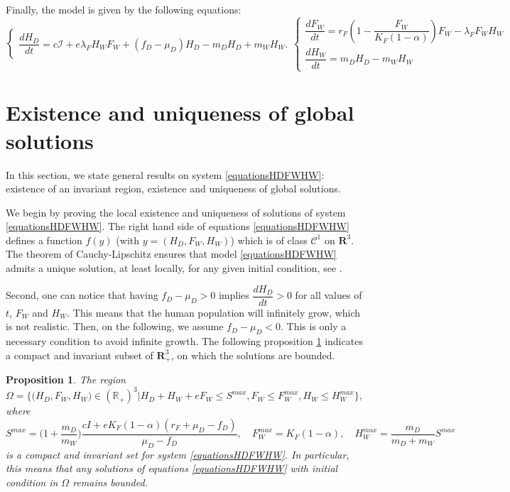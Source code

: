 \documentclass{article}
\newcommand{\lfw}{\lambda_{F}}
\newcommand{\lfw}{\lambda_{F}}
\newcommand{\cI}{c \mathcal{I}}
\newtheorem{prop}{Proposition}
\begin{document}
Finally, the model is given by the following equations:
\begin{subequations}
\begin{equation}
\left\{ \begin{array}{l}
\dfrac{dH_D}{dt}= \cI + e\lfw H_W F_W + (f_D - \mu_D) H_D - m_D H_D + m_W H_W.
\end{array}\right.
\end{equation}
\begin{equation}
\left\lbrace \begin{array}{l}
\dfrac{dF_W}{dt} = r_F \left(1 - \dfrac{F_W}{K_F(1-\alpha)} \right) F_W - \lfw F_W H_W \\
\dfrac{dH_W}{dt}= m_D H_D - m_W H_W 
\end{array} \right.
\end{equation}
\label{equationsHDFWHW}
\end{subequations}

\section{Existence and uniqueness of global solutions}
In this section, we state general results on system \eqref{equationsHDFWHW}:  existence of an invariant region, existence and uniqueness of global solutions.

We begin by proving the local existence and uniqueness of solutions of system \eqref{equationsHDFWHW}. The right hand side of equations \eqref{equationsHDFWHW} defines a function $f(y)$ (with $y = (H_D, F_W, H_W)$) which is of class $\mathcal{C}^1$ on $\mathbf{R}^3$. The theorem of Cauchy-Lipschitz ensures that model \eqref{equationsHDFWHW} admits a unique solution, at least locally, for any given initial condition, see \cite{walter_ordinary_1998}.

Second, one can notice that having $f_D - \mu_D > 0$ implies $\dfrac{dH_D}{dt} > 0$ for all values of $t$, $F_W$ and $H_W$. This means that the human population will infinitely grow, which is not realistic. Then, on the following, we assume $f_D - \mu_D < 0$. This is only a necessary condition to avoid infinite growth. The following proposition \ref{Invariant region} indicates a compact and invariant subset of $\mathbf{R}_+^3$, on which the solutions are bounded.

\begin{prop}\label{Invariant region}
The region
$$\Omega = \Big\{\Big(H_D, F_W, H_W \Big) \in (\mathbb{R}_+)^3  \Big|H_D + H_W + eF_W \leq S^{max}, F_W \leq F_W^{max}, H_W \leq H_W^{max} \Big\},$$
where
$$
S^{max} = \Big(1 + \dfrac{m_D}{m_W} \Big) \dfrac{cI + e K_F (1-\alpha) (r_F + \mu_D - f_D)}{\mu_D - f_D},
\quad
F_W^{max} = K_F(1-\alpha),
\quad
H_W^{max} = \dfrac{m_D}{m_D + m_W} S^{max}
$$
is a compact and invariant set for system \eqref{equationsHDFWHW}. In particular, this means that any solutions of equations \eqref{equationsHDFWHW} with initial condition in $\Omega$ remains bounded.
\end{prop}
\end{document}

